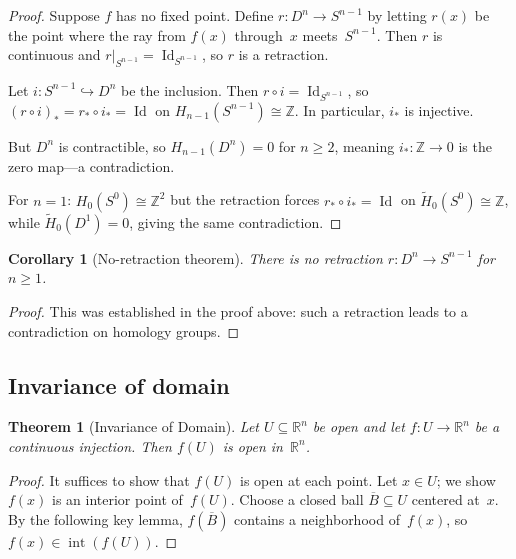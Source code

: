 \documentclass[12pt,a4paper,openany]{book}
\theoremstyle{definition}
\theoremstyle{plain}
\newtheorem{theorem}[definition]{Theorem}
\newtheorem{corollary}[definition]{Corollary}
\theoremstyle{remark}
\newcommand{\Z}{\mathbb{Z}}
\newcommand{\R}{\mathbb{R}}
\DeclareMathOperator{\Id}{Id}
\begin{document}
\begin{proof}
Suppose $f$ has no fixed point.  Define $r\colon D^n\to S^{n-1}$ by
letting $r(x)$ be the point where the ray from $f(x)$ through~$x$
meets~$S^{n-1}$.  Then $r$ is continuous and $r|_{S^{n-1}}=\Id_{S^{n-1}}$,
so $r$ is a retraction.

Let $i\colon S^{n-1}\hookrightarrow D^n$ be the inclusion.  Then
$r\circ i=\Id_{S^{n-1}}$, so $(r\circ i)_*=r_*\circ i_*=\Id$ on
$H_{n-1}(S^{n-1})\cong\Z$.  In particular, $i_*$ is injective.

But $D^n$ is contractible, so $H_{n-1}(D^n)=0$ for $n\ge 2$, meaning
$i_*\colon\Z\to 0$ is the zero map---a contradiction.

For $n=1$: $H_0(S^0)\cong\Z^2$ but the retraction forces
$r_*\circ i_*=\Id$ on $\widetilde{H}_0(S^0)\cong\Z$, while
$\widetilde{H}_0(D^1)=0$, giving the same contradiction.
\end{proof}

\begin{corollary}[No-retraction theorem]\label{cor:no-retraction}
There is no retraction $r\colon D^n\to S^{n-1}$ for $n\ge 1$.
\end{corollary}

\begin{proof}
This was established in the proof above: such a retraction leads to
a contradiction on homology groups.
\end{proof}

\subsection{Invariance of domain}\label{subsec:invariance-domain}

\begin{theorem}[Invariance of Domain]\label{thm:invariance-domain}
Let $U\subseteq\R^n$ be open and let $f\colon U\to\R^n$ be a continuous
injection.  Then $f(U)$ is open in~$\R^n$.
\end{theorem}

\begin{proof}
It suffices to show that $f(U)$ is open at each point.  Let $x\in U$;
we show $f(x)$ is an interior point of~$f(U)$.  Choose a closed ball
$\overline{B}\subseteq U$ centered at~$x$.  By the following key lemma,
$f(\overline{B})$ contains a neighborhood of~$f(x)$, so $f(x)\in
\operatorname{int}(f(U))$.
\end{proof}
\end{document}
